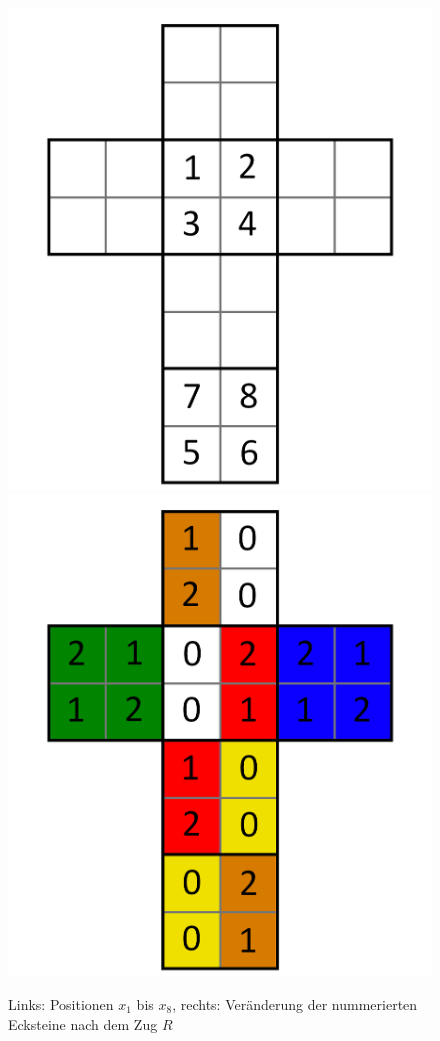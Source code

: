 \documentclass[12pt,a4paper, usenames, dvipsnames]{article}
\theoremstyle{mystyle}
\theoremstyle{definition}
\begin{document}
\begin{figure}[H]
\centering
\includegraphics[scale=0.13]{foldedout_012_white.png}
\includegraphics[scale=0.13]{foldedout_012_spin.png}
\caption[Links: $x_1$ bis $x_8$, rechts: Veränderung nach dem Zug $R$]{Links: Positionen $x_1$ bis $x_8$, rechts: Veränderung der nummerierten Ecksteine nach dem Zug $R$}
\label{Abbildung_XnachZugR}
\end{figure}
\end{document}
